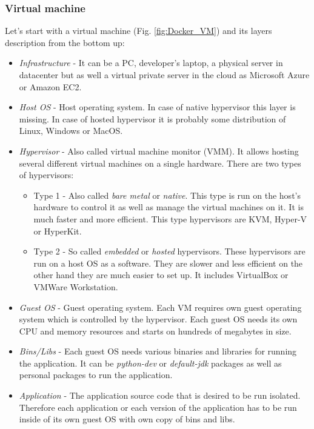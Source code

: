 \documentclass[12pt,a4paper]{article}
\begin{document}
\subsubsection{Virtual machine}
Let's start with a virtual machine (Fig. \ref{fig:Docker_VM}) and its layers description from the bottom up:
\begin{itemize}
\item \textit{Infrastructure} - It can be a PC, developer's laptop, a physical server in datacenter but as well a virtual private
server in the cloud as Microsoft Azure or Amazon EC2.
\item \textit{Host OS} - Host operating system. In case of native hypervisor this layer is missing. In case of hosted hypervisor
it is probably some distribution of Linux, Windows or MacOS.
\item \textit{Hypervisor} - Also called virtual machine monitor (VMM). It allows hosting several different virtual machines
on a single hardware. There are two types of hypervisors:
\begin{itemize}
\item Type 1 -  Also called \textit{bare metal} or \textit{native}. This type is run on the host's hardware to control it as well as manage 
the virtual machines on it. It is much faster and more efficient. This type hypervisors are KVM, Hyper-V or HyperKit.
\item Type 2 - So called \textit{embedded} or \textit{hosted} hypervisors. These hypervisors are run on a host OS as a software. They are slower
and less efficient on the other hand they are much easier to set up. It includes VirtualBox or VMWare Workstation.
\end{itemize}
\item \textit{Guest OS} - Guest operating system. Each VM requires own guest operating system which is controlled by the hypervisor. Each 
guest OS needs its own CPU and memory resources and starts on hundreds of megabytes in size.
\item \textit{Bins/Libs} - Each guest OS needs various binaries and libraries for running the application. It can be \textit{python-dev} or \textit{default-jdk} packages as well as personal packages to run the application.
\item \textit{Application} - The application source code that is desired to be run isolated. Therefore each application or each version of the application has to be run inside of its own guest OS with own copy of bins and libs. 
\end{itemize}
\end{document}
